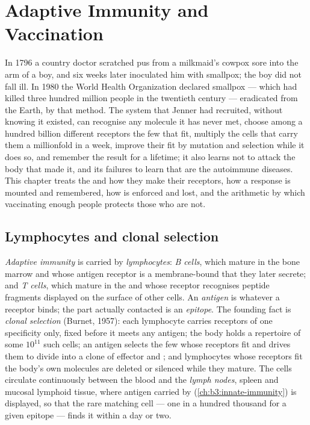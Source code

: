 \chapter{Adaptive Immunity and Vaccination}\label{ch:b3:adaptive-immunity}

In 1796 a country doctor scratched pus from a milkmaid's cowpox sore
into the arm of a boy, and six weeks later inoculated him with smallpox;
the boy did not fall ill. In 1980 the World Health Organization
declared smallpox --- which had killed three hundred million people in
the twentieth century --- eradicated from the Earth, by that method. The
system that Jenner had recruited, without knowing it existed, can
recognise any molecule it has never met, choose among a hundred billion
different receptors the few that fit, multiply the cells that carry
them a millionfold in a week, improve their fit by mutation and
selection while it does so, and remember the result for a lifetime; it
also learns not to attack the body that made it, and its failures to
learn that are the autoimmune diseases. This chapter treats the
 and how they make their receptors, how a response is
mounted and remembered, how  is enforced and lost, and the
arithmetic by which vaccinating enough people protects those who are
not.

\section{Lymphocytes and clonal selection}

\begin{definition}\label{def:b3:adaptive-immunity:lymphocytes}
\emph{Adaptive immunity} is carried by \emph{lymphocytes}: \emph{B cells},
which mature in the bone marrow and whose antigen receptor is a
membrane-bound \emph{} that they later secrete; and \emph{T
cells}, which mature in the  and whose receptor recognises
peptide fragments displayed on the surface of other cells. An
\emph{antigen} is whatever a receptor binds; the part actually
contacted is an \emph{epitope}. The founding fact is \emph{clonal
selection} (Burnet, 1957): each lymphocyte carries receptors of one
specificity only, fixed before it meets any antigen; the body holds a
repertoire of some $10^{11}$ such cells; an antigen selects the few
whose receptors fit and drives them to divide into a clone of effector
and ; and lymphocytes whose receptors fit the body's own
molecules are deleted or silenced while they mature. The cells
circulate continuously between the blood and the \emph{lymph nodes},
spleen and mucosal lymphoid tissue, where antigen carried by  (\cref{ch:b3:innate-immunity}) is displayed, so that the rare
matching cell --- one in a hundred thousand for a given epitope ---
finds it within a day or two.
\end{definition}

